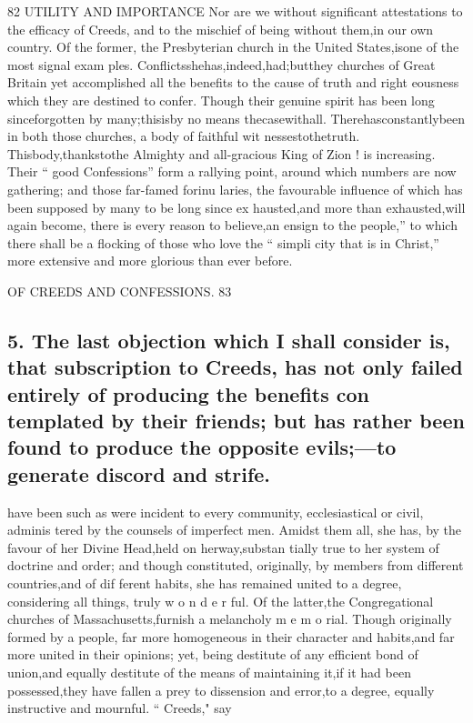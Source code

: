 \documentclass[
]{book}
\begin{document}
82 UTILITY AND IMPORTANCE
Nor are we without significant attestations to the efficacy of Creeds, and to the mischief
of being without them,in our own country. Of the former, the Presbyterian church in the United States,isone of the most signal exam ples. Conflictsshehas,indeed,had;butthey
churches of Great Britain yet accomplished
all the benefits to the cause of truth and right
eousness which they are destined to confer.
Though their genuine spirit has been long
sinceforgotten by many;thisisby no means thecasewithall. Therehasconstantlybeen
in both those churches, a body of faithful wit nessestothetruth. Thisbody,thankstothe Almighty and all-gracious King of Zion ! is increasing. Their `` good Confessions'' form a rallying point, around which numbers are now gathering; and those far-famed forinu laries, the favourable influence of which has been supposed by many to be long since ex
hausted,and more than exhausted,will again become, there is every reason to believe,an
ensign to the people,'' to which there shall be a flocking of those who love the `` simpli city that is in Christ,'' more extensive and more glorious than ever before.

OF CREEDS AND CONFESSIONS. 83

\hypertarget{the-last-objection-which-i-shall-consider-is-that-subscription-to-creeds-has-not-only-failed-entirely-of-producing-the-benefits-con-templated-by-their-friends-but-has-rather-been-found-to-produce-the-opposite-evilsto-generate-discord-and-strife.}{%
\subsection{5. The last objection which I shall consider is, that subscription to Creeds, has not only failed entirely of producing the benefits con templated by their friends; but has rather been found to produce the opposite evils;---to generate discord and strife.}\label{the-last-objection-which-i-shall-consider-is-that-subscription-to-creeds-has-not-only-failed-entirely-of-producing-the-benefits-con-templated-by-their-friends-but-has-rather-been-found-to-produce-the-opposite-evilsto-generate-discord-and-strife.}}

have been such as were incident to every
community, ecclesiastical or civil, adminis
tered by the counsels of imperfect men.
Amidst them all, she has, by the favour of
her Divine Head,held on herway,substan
tially true to her system of doctrine and
order; and though constituted, originally, by
members from different countries,and of dif
ferent habits, she has remained united to a
degree, considering all things, truly w o n d e r
ful. Of the latter,the Congregational churches
of Massachusetts,furnish a melancholy m e m o
rial. Though originally formed by a people, far more homogeneous in their character and
habits,and far more united in their opinions; yet, being destitute of any efficient bond of
union,and equally destitute of the means of maintaining it,if it had been possessed,they have fallen a prey to dissension and error,to a degree, equally instructive and mournful.
`` Creeds," say
\end{document}
